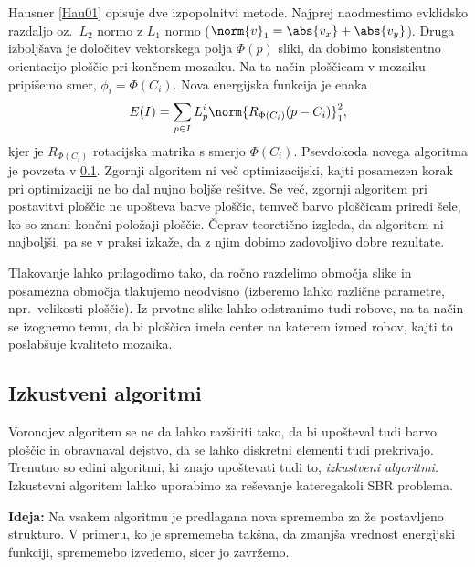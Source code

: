 Hausner \ref{Hau01} opisuje dve izpopolnitvi metode. Najprej naodmestimo evklidsko razdaljo oz.\ $L_2$ normo z $L_1$ normo ($\norm{v}_1 = \abs{v_x} + \abs{v_y}$). Druga izboljšava je določitev vektorskega polja $\Phi(p)$ sliki, da dobimo konsistentno orientacijo ploščic pri končnem mozaiku. Na ta način ploščicam v mozaiku pripišemo smer, $\phi_i = \Phi(C_i)$. Nova energijska funkcija je enaka
%
\begin{align*}
E(I) = \sum_{p \in I} L_p^i \norm{R_{\Phi(C_i)} (p - C_i)}_1^2,
\end{align*}
%
kjer je $R_{\Phi(C_i)}$ rotacijska matrika s smerjo $\Phi(C_i)$. Psevdokoda novega algoritma je povzeta v \ref{}.
%
Zgornji algoritem ni več optimizacijski, kajti posamezen korak pri optimizaciji ne bo dal nujno boljše rešitve. Še več, zgornji algoritem pri postavitvi ploščic ne upošteva barve ploščic, temveč barvo ploščicam priredi šele, ko so znani končni položaji ploščic. Čeprav teoretično izgleda, da algoritem ni najboljši, pa se v praksi izkaže, da z njim dobimo zadovoljivo dobre rezultate.

Tlakovanje lahko prilagodimo tako, da ročno razdelimo območja slike in posamezna območja tlakujemo neodvisno (izberemo lahko različne parametre, npr.\ velikosti ploščic). Iz prvotne slike lahko odstranimo tudi robove, na ta način se izognemo temu, da bi ploščica imela center na katerem izmed robov, kajti to poslabšuje kvaliteto mozaika.
%
\subsection{Izkustveni algoritmi}
Voronojev algoritem se ne da lahko razširiti tako, da bi upošteval tudi barvo ploščic in obravnaval dejstvo, da se lahko diskretni elementi tudi prekrivajo. Trenutno so edini algoritmi, ki znajo upoštevati tudi to, \emph{izkustveni algoritmi}. Izkustevni algoritem lahko uporabimo za reševanje kateregakoli SBR problema.

\textbf{Ideja:} Na vsakem algoritmu je predlagana nova sprememba za že postavljeno strukturo. V primeru, ko je sprememeba takšna, da zmanjša vrednost energijski funkciji, sprememebo izvedemo, sicer jo zavržemo.


